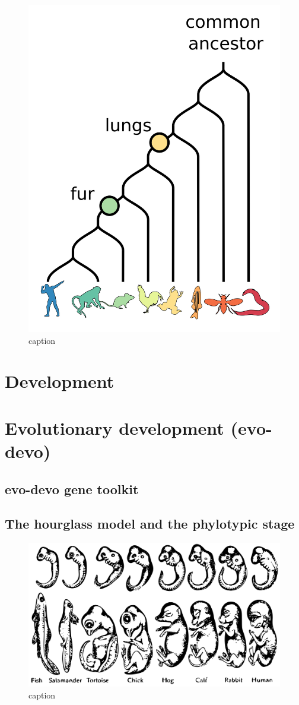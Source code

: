 \begin{figure}[H]
    \includegraphics[width=0.5\linewidth]{ch1.Introduction/imgs/phylogeny.png}
    \caption{caption}
    \label{fig:phylogeny}
\end{figure}

\section{Development}

\section{Evolutionary development (evo-devo)}



\subsection{evo-devo gene toolkit}
\subsection{The hourglass model and the phylotypic stage}

\begin{figure}[H]
    \includegraphics[width=\linewidth]{ch1.Introduction/imgs/haeckel.png}
    \caption{caption}
    \label{fig:haeckel}
\end{figure}

